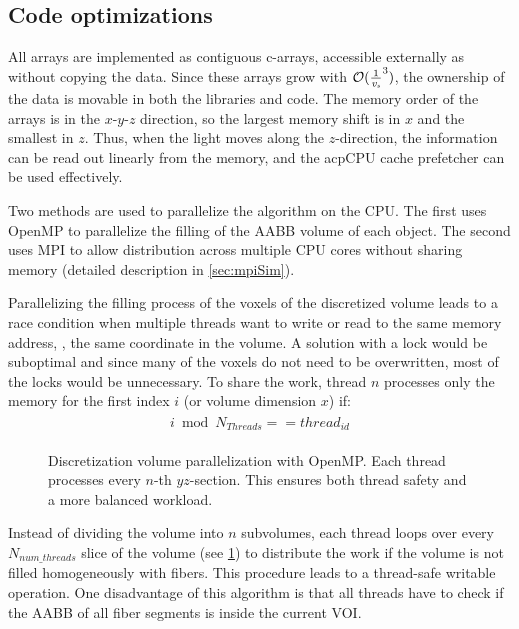 \subsection{Code optimizations}\label{sec:dvOpti}
%
All arrays are implemented as contiguous c-arrays, accessible externally as  without copying the data.
Since these arrays grow with $\mathcal{O}(\frac{1}{\textnormal{$\mathit{v_{s}}$}}^3)$, the ownership of the data is movable in both the \cpp{} libraries and \python{} code.
The memory order of the arrays is in the $x\text{-}y\text{-}z$ direction, so the largest memory shift is in $x$ and the smallest in $z$.
Thus, when the light moves along the $z$-direction, the information can be read out linearly from the memory, and the acp{CPU} cache prefetcher can be used effectively. 
\par
%
Two methods are used to parallelize the algorithm on the \ac{CPU}.
The first uses \ac{OpenMP} to parallelize the filling of the \ac{AABB} volume of each object.
The second uses \ac{MPI} to allow distribution across multiple \ac{CPU} cores without sharing memory (detailed description in \cref{sec:mpiSim}).
\par
%
Parallelizing the filling process of the voxels of the discretized volume leads to a race condition when multiple threads want to write or read to the same memory address, \ie{}, the same coordinate in the volume.
A solution with a lock would be suboptimal and since many of the voxels do not need to be overwritten, most of the locks would be unnecessary.
To share the work, thread $n$ processes only the memory for the first index $i$ (or volume dimension $x$) if:
%
\begin{align}
\begin{split}
    i \bmod N_{\mathit{Threads}} == \mathit{thread}_{\mathit{id}}
\end{split}
\end{align}
%
\begin{figure}[!t]
\centering
\setlength{\tikzwidth}{0.5\textwidth}
\caption{Discretization volume parallelization with \ac{OpenMP}. Each thread processes every $n$-th $yz$-section. This ensures both thread safety and a more balanced workload.}
\label{fig:discVolThread}
\end{figure}
% 
Instead of dividing the volume into $n$ subvolumes, each thread loops over every $N_{\mathit{num\_threads}}$ slice of the volume (see \cref{fig:discVolThread}) to distribute the work if the volume is not filled homogeneously with fibers. 
This procedure leads to a thread-safe writable operation.
One disadvantage of this algorithm is that all threads have to check if the \ac{AABB} of all fiber segments is inside the current \ac{VOI}.
% 
% 
%
